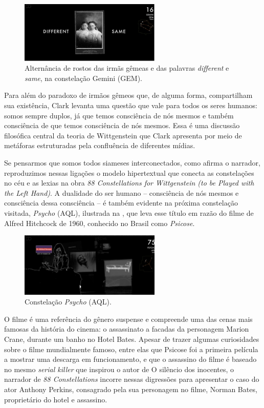 \documentclass[portuguese]{textolivre}
\begin{document}
\begin{figure}[htbp]
 \centering
 \includegraphics[width=0.6\textwidth]{Fig7[1].jpg}
 \caption{Alternância de rostos das irmãs gêmeas e das palavras \emph{different} e \emph{same}, na constelação Gemini (GEM).}
 \label{fig7}
\end{figure}

Para além do paradoxo de irmãos gêmeos que, de alguma forma, compartilham sua existência, Clark levanta uma questão que vale para todos os seres humanos: somos sempre duplos, já que temos consciência de nós mesmos e também consciência de que temos consciência de nós mesmos. Essa é uma discussão filosófica central da teoria de Wittgenstein que Clark apresenta por meio de metáforas estruturadas pela confluência de diferentes mídias. 

Se pensarmos que somos todos siameses interconectados, como afirma o narrador, reproduzimos nessas ligações o modelo hipertextual que conecta as constelações no céu e as lexias na obra \emph{88 Constellations for Wittgenstein (to be Played with the Left Hand)}. A dualidade do ser humano – consciência de nós mesmos e consciência dessa consciência – é também evidente na próxima constelação visitada, \emph{Psycho} (AQL), ilustrada na , que leva esse título em razão do filme de Alfred Hitchcock de 1960, conhecido no Brasil como \emph{Psicose}.

\begin{figure}[htbp]
 \centering
 \includegraphics[width=0.6\textwidth]{Fig8[1].jpg}
 \caption{Constelação \emph{Psycho} (AQL).}
 \label{fig8}
\end{figure}

O filme é uma referência do gênero suspense e compreende uma das cenas mais famosas da história do cinema: o assassinato a facadas da personagem Marion Crane, durante um banho no Hotel Bates. Apesar de trazer algumas curiosidades sobre o filme mundialmente famoso, entre elas que Psicose foi a primeira película a mostrar uma descarga em funcionamento, e que o assassino do filme é baseado no mesmo \emph{serial killer} que inspirou o autor de O silêncio dos inocentes, o narrador de \emph{88 Constellations} incorre nessas digressões para apresentar o caso do ator Anthony Perkins, consagrado pela sua personagem no filme, Norman Bates, proprietário do hotel e assassino. 
\end{document}
